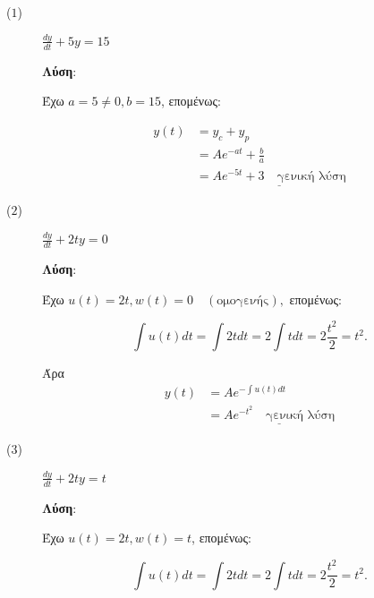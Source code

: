 \documentclass[a4paper,12pt]{article}
\begin{document}
\begin{description}

\item [($1$)] $\boxed{\frac{dy}{dt} + 5y = 15}$

\textbf{Λύση}:

\vspace{\baselineskip}

Έχω $a=5\neq 0, b=15$, επομένως:

\begin{minipage}{0.4\textwidth}
\begin{align*}
y(t) &= y_c + y_p \\
&=Ae^{-at} + \frac{b}{a} \\
&= \underline{Ae^{-5t} + 3 \quad\text{γενική λύση}}
\end{align*}
\end{minipage}

\vspace{\baselineskip}


\item [($2$)] $\boxed{\frac{dy}{dt} + 2ty = 0}$

\textbf{Λύση}:

\vspace{\baselineskip}

Έχω $u(t)=2t, w(t)=0 \quad(\text{ομογενής}),$ επομένως:

\[\int u(t)dt = \int 2tdt = 2\int tdt = 2\frac{t^2}{2} = t^2.\]

\begin{minipage}{0.4\textwidth}
Άρα
\begin{align*}
y(t) &= Ae^{-\int u(t)dt} \\
&= \underline{Ae^{-t^2} \quad\text{γενική λύση}}
\end{align*}
\end{minipage}

\vspace{\baselineskip}


\item [($3$)] $\boxed{\frac{dy}{dt} + 2ty = t}$

\textbf{Λύση}:

\vspace{\baselineskip}

Έχω $u(t)=2t, w(t)=t$, επομένως:

\[
\int u(t)dt = \int 2tdt = 2\int tdt = 2\frac{t^2}{2} = t^2.
\]


\end{description}
\end{document}
